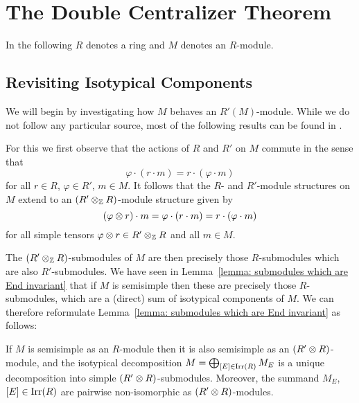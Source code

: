 \section{The Double Centralizer Theorem}


\begin{conventions}
  In the following $R$ denotes a ring and $M$ denotes an $R$-module.
\end{conventions}





\subsection{Revisiting Isotypical Components}


\begin{fluff}
  We will begin by investigating how $M$ behaves an $R'(M)$-module.
  While we do not follow any particular source, most of the following results can be found in \cite[Chapter~3.2]{DaSilva2017NonCommutative}.
  
  For this we first observe that the actions of $R$ and $R'$ on $M$ commute in the sense that
  \[
      \varphi \cdot (r \cdot m)
    = r \cdot (\varphi \cdot m)
  \]
  for all $r \in R$, $\varphi \in R'$, $m \in M$.
  It follows that the $R$- and $R'$-module structures on $M$ extend to an $(R' \mathbin{\otimes}_{\mathbb{Z}} R)$-module structure given by
  \[
      (\varphi \mathbin{\otimes} r) \cdot m
    = \varphi \cdot (r \cdot m)
    = r \cdot (\varphi \cdot m)
  \]
  for all simple tensors $\varphi \mathbin{\otimes} r \in R' \mathbin{\otimes}_{\mathbb{Z}} R$ and all $m \in M$.
  
  The $(R' \mathbin{\otimes}_{\mathbb{Z}} R)$-submodules of $M$ are then precisely those $R$-submodules which are also $R'$-submodules.
  We have seen in Lemma~\ref{lemma: submodules which are End invariant} that if $M$ is semisimple then these are precisely those $R$-submodules, which are a (direct) sum of isotypical components of $M$.
  We can therefore reformulate Lemma~\ref{lemma: submodules which are End invariant} as follows:
\end{fluff}


\begin{lemma}
  \label{lemma: unique decomposition into simple R' tensor R modules}
  If $M$ is semisimple as an $R$-module then it is also semisimple as an $(R' \mathbin{\otimes} R)$-module, and the isotypical decomposition $M = \bigoplus_{[E] \in \operatorname{Irr}(R)} M_E$ is a unique decomposition into simple $(R' \mathbin{\otimes} R)$-submodules.
  Moreover, the summand $M_E$, $[E] \in \operatorname{Irr}(R)$ are pairwise non-isomorphic as $(R' \mathbin{\otimes} R)$-modules.
\end{lemma}


